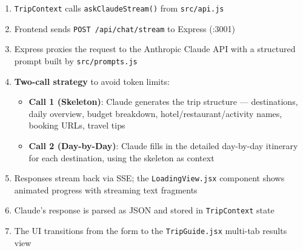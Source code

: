 \documentclass[11pt,a4paper]{article}
\begin{document}
\begin{infobox}
\begin{enumerate}[nosep]
\item \texttt{TripContext} calls \texttt{askClaudeStream()} from \texttt{src/api.js}
\item Frontend sends \texttt{POST /api/chat/stream} to Express (:3001)
\item Express proxies the request to the Anthropic Claude API with a structured prompt built by \texttt{src/prompts.js}
\item \textbf{Two-call strategy} to avoid token limits:
    \begin{itemize}[nosep]
    \item \textbf{Call 1 (Skeleton)}: Claude generates the trip structure --- destinations, daily overview, budget breakdown, hotel/restaurant/activity names, booking URLs, travel tips
    \item \textbf{Call 2 (Day-by-Day)}: Claude fills in the detailed day-by-day itinerary for each destination, using the skeleton as context
    \end{itemize}
\item Responses stream back via SSE; the \texttt{LoadingView.jsx} component shows animated progress with streaming text fragments
\item Claude's response is parsed as JSON and stored in \texttt{TripContext} state
\item The UI transitions from the form to the \texttt{TripGuide.jsx} multi-tab results view
\end{enumerate}
\end{infobox}
\end{document}
